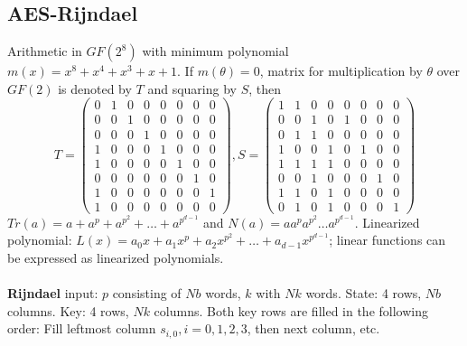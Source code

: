 \subsection{AES-Rijndael}
Arithmetic in $GF(2^8 )$ with minimum polynomial $m(x)= x^8 + x^4 +x^3 +x
+1$.  If $m(\theta)=0$, matrix for multiplication by $\theta$ over $GF(2)$ is denoted
by $T$ and squaring by $S$, then
$$
T=
\left(
\begin{array}{cccccccc}
0 & 1 & 0 & 0 & 0 & 0 & 0 & 0 \\
0 & 0 & 1 & 0 & 0 & 0 & 0 & 0 \\
0 & 0 & 0 & 1 & 0 & 0 & 0 & 0 \\
1 & 0 & 0 & 0 & 1 & 0 & 0 & 0 \\
1 & 0 & 0 & 0 & 0 & 1 & 0 & 0 \\
0 & 0 & 0 & 0 & 0 & 0 & 1 & 0 \\
1 & 0 & 0 & 0 & 0 & 0 & 0 & 1 \\
1 & 0 & 0 & 0 & 0 & 0 & 0 & 0  
\end{array}
\right), 
S=
\left(
\begin{array}{cccccccc}
1 & 1 & 0 & 0 & 0 & 0 & 0 & 0 \\
0 & 0 & 1 & 0 & 1 & 0 & 0 & 0 \\
0 & 1 & 1 & 0 & 0 & 0 & 0 & 0 \\
1 & 0 & 0 & 1 & 0 & 1 & 0 & 0 \\
1 & 1 & 1 & 1 & 0 & 0 & 0 & 0 \\
0 & 0 & 1 & 0 & 0 & 0 & 1 & 0 \\
1 & 1 & 0 & 1 & 0 & 0 & 0 & 0 \\
0 & 1 & 0 & 1 & 0 & 0 & 0 & 1  
\end{array}
\right)
$$  
$Tr(a)= a + a^p + a^{p^2} + \ldots + a^{p^{d-1}}$ and
$N(a)= a  a^p  a^{p^2}  \ldots  a^{p^{d-1}}$.
Linearized polynomial: $L(x)= a_0 x + a_1 x^p + a_2 x^{p^2} + \ldots + a_{d-1} x^{p^{d-1}}$;
linear functions can be expressed as linearized polynomials.
\\
\\
{\bf Rijndael} input: $p$ consisting of $Nb$ words, $k$ with $Nk$ words.
State: 4 rows, $Nb$ columns.
Key: 4 rows, $Nk$ columns.
Both key rows are filled in the following order:
Fill leftmost column $s_{i,0}, i= 0, 1, 2, 3$,
then next column, etc.
